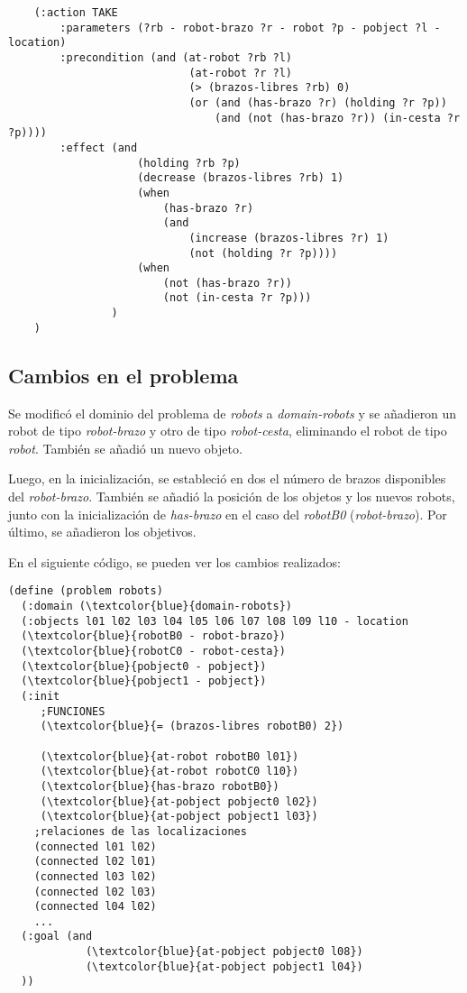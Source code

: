 \documentclass{article}
\begin{document}
\begin{itemize}
    \begin{verbatim}
    (:action TAKE
        :parameters (?rb - robot-brazo ?r - robot ?p - pobject ?l - location)
        :precondition (and (at-robot ?rb ?l)
                            (at-robot ?r ?l)
                            (> (brazos-libres ?rb) 0)
                            (or (and (has-brazo ?r) (holding ?r ?p))
                                (and (not (has-brazo ?r)) (in-cesta ?r ?p))))
        :effect (and
                    (holding ?rb ?p)
                    (decrease (brazos-libres ?rb) 1)
                    (when
                        (has-brazo ?r)
                        (and
                            (increase (brazos-libres ?r) 1)
                            (not (holding ?r ?p))))
                    (when
                        (not (has-brazo ?r))
                        (not (in-cesta ?r ?p)))
                )
    )
    \end{verbatim}
\end{itemize}



\subsection{Cambios en el problema}
Se modificó el dominio del problema de \textit{robots} a \textit{domain-robots} y se añadieron un robot de tipo \textit{robot-brazo} 
y otro de tipo \textit{robot-cesta}, eliminando el robot de tipo \textit{robot}. También se añadió un nuevo objeto. 

Luego, en la inicialización, se estableció en dos el número de brazos disponibles del \textit{robot-brazo}. También se añadió la posición de los objetos 
y los nuevos robots, junto con la inicialización de \textit{has-brazo} en el caso del \textit{robotB0} (\textit{robot-brazo}). 
Por último, se añadieron los objetivos. 

En el siguiente código, se pueden ver los cambios realizados:

\begin{Verbatim}[commandchars=\\\{\}]
(define (problem robots)
  (:domain (\textcolor{blue}{domain-robots})
  (:objects l01 l02 l03 l04 l05 l06 l07 l08 l09 l10 - location
  (\textcolor{blue}{robotB0 - robot-brazo})
  (\textcolor{blue}{robotC0 - robot-cesta})
  (\textcolor{blue}{pobject0 - pobject})
  (\textcolor{blue}{pobject1 - pobject})
  (:init
     ;FUNCIONES
     (\textcolor{blue}{= (brazos-libres robotB0) 2})

     (\textcolor{blue}{at-robot robotB0 l01})
     (\textcolor{blue}{at-robot robotC0 l10})
     (\textcolor{blue}{has-brazo robotB0})
     (\textcolor{blue}{at-pobject pobject0 l02})
     (\textcolor{blue}{at-pobject pobject1 l03})
    ;relaciones de las localizaciones
    (connected l01 l02)
    (connected l02 l01)
    (connected l03 l02)
    (connected l02 l03)
    (connected l04 l02)
    ...
  (:goal (and
            (\textcolor{blue}{at-pobject pobject0 l08})
            (\textcolor{blue}{at-pobject pobject1 l04})
  ))
\end{Verbatim}
\end{document}
